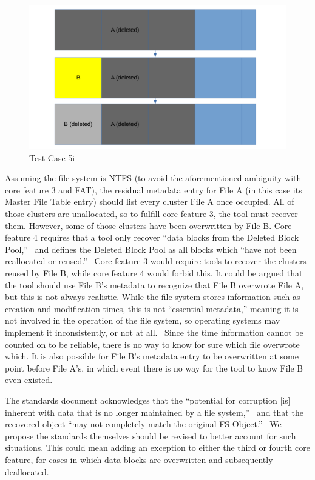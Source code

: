 \begin{figure}[h]
    \centering
    \includegraphics[width=\linewidth]{fig/case5i.png}
    \caption{Test Case 5i}
    \label{fig:case_5i}
\end{figure}

Assuming the file system is NTFS (to avoid the aforementioned ambiguity with core feature 3 and FAT), the residual metadata entry for File A (in this case its Master File Table entry) should list every cluster File A once occupied. 
All of those clusters are unallocated, so to fulfill core feature 3, the tool must recover them. 
However, some of those clusters have been overwritten by File B. Core feature 4 requires that a tool only recover ``data blocks from the Deleted Block Pool,''~\cite{meta:dfr:standards} and defines the Deleted Block Pool as all blocks which ``have not been reallocated or reused.''~\cite{meta:dfr:standards}
Core feature 3 would require tools to recover the clusters reused by File B, while core feature 4 would forbid this. 
It could be argued that the tool should use File B's metadata to recognize that File B overwrote File A, but this is not always realistic. 
While the file system stores information such as creation and modification times, this is not ``essential metadata,'' meaning it is not involved in the operation of the file system, so operating systems may implement it inconsistently, or not at all.~\cite{carrier:filesystems}
Since the time information cannot be counted on to be reliable, there is no way to know for sure which file overwrote which. 
It is also possible for File B's metadata entry to be overwritten at some point before File A's, in which event there is no way for the tool to know File B even existed.

The standards document acknowledges that the ``potential for corruption [is] inherent with data that is no longer maintained by a file system,''~\cite{meta:dfr:standards} and that the recovered object ``may not completely match the original FS-Object.''~\cite{meta:dfr:standards}
We propose the standards themselves should be revised to better account for such situations.
This could mean adding an exception to either the third or fourth core feature, for cases in which data blocks are overwritten and subsequently deallocated.

